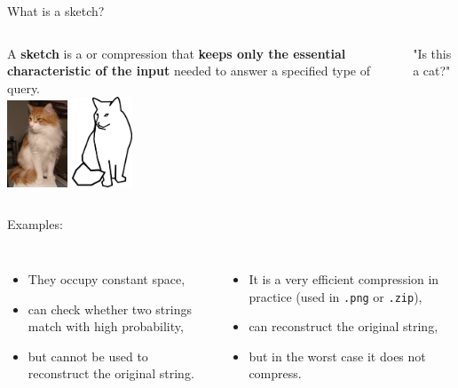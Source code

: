 \begin{frame}{What is a sketch?}
    \begin{columns}
        A \textbf{sketch} is a  or  compression that \textbf{keeps only the essential characteristic of the input} needed to answer a specified type of query.\\
        \includegraphics[width=1.8cm]{pictures/photo_betisou.jpg}
        \hspace{0.5cm}
        \includegraphics[width=1.8cm]{pictures/betisou.png}\\
        \begin{center}
            "Is this a cat?"
        \end{center}
    \end{columns}

    {\Large Examples:}
    \medskip
    \begin{columns}
        {}
        \begin{itemize}
            \item They occupy constant space,  
            \item can check whether two strings match with high probability,
            \item but cannot be used to reconstruct the original string. 
        \end{itemize}
        {}
        \begin{itemize}
            \item It is a very efficient compression in practice (used in \texttt{.png} or \texttt{.zip}),
            \item can reconstruct the original string,
            \item but in the worst case it does not compress. 
        \end{itemize}
    \end{columns}
    
\end{frame}

